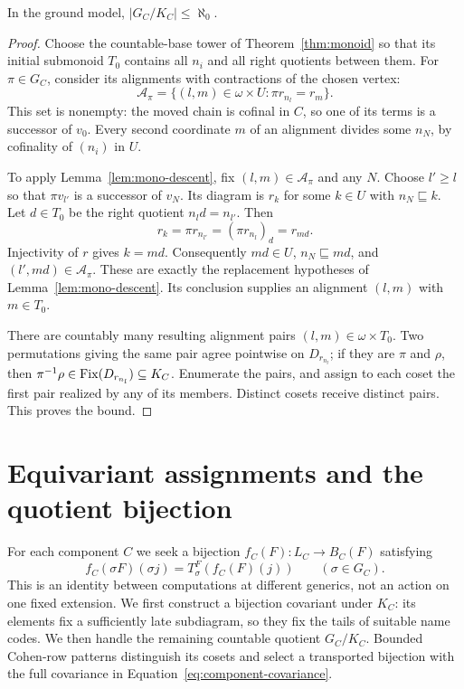 \begin{lemma}\label{lem:countable-germs}
In the ground model, $|G_C/K_C|\le\aleph_0$.
\end{lemma}
\begin{proof}
Choose the countable-base tower of Theorem~\ref{thm:monoid} so that
its initial submonoid $T_0$ contains all $n_i$ and all right
quotients between them. For $\pi\in G_C$, consider its alignments
with contractions of the chosen vertex:
\[
 \mathcal A_\pi=
 \{(l,m)\in\omega\times U:\pi r_{n_l}=r_m\}.
\]
This set is nonempty: the moved chain is cofinal in $C$, so one of
its terms is a successor of $v_0$. Every second coordinate $m$ of
an alignment divides some $n_N$, by cofinality of $(n_i)$ in $U$.

To apply Lemma~\ref{lem:mono-descent}, fix $(l,m)\in\mathcal A_\pi$
and any $N$. Choose $l'\ge l$ so that $\pi v_{l'}$ is a successor
of $v_N$. Its diagram is $r_k$ for some $k\in U$ with
$n_N\sqsubseteq k$. Let $d\in T_0$ be the right quotient
$n_ld=n_{l'}$. Then
\[
 r_k=\pi r_{n_{l'}}=(\pi r_{n_l})_d=r_{md}.
\]
Injectivity of $r$ gives $k=md$. Consequently $md\in U$,
$n_N\sqsubseteq md$, and $(l',md)\in\mathcal A_\pi$.
These are exactly the replacement hypotheses of
Lemma~\ref{lem:mono-descent}. Its conclusion supplies an alignment
$(l,m)$ with $m\in T_0$.

There are countably many resulting alignment pairs
$(l,m)\in\omega\times T_0$. Two permutations giving the same pair
agree pointwise on $D_{r_{n_l}}$; if they are $\pi$ and $\rho$,
then $\pi^{-1}\rho\in\operatorname{Fix}(D_{r_{n_l}})\subseteq K_C$.
Enumerate the pairs, and assign to each coset the first
pair realized by any of its members. Distinct cosets receive distinct
pairs. This proves the bound.
\end{proof}

\section{Equivariant assignments and the quotient bijection}
\label{sec:quotient-equivariance}

For each component $C$ we seek a bijection
$f_C(F):L_C\to B_C(F)$ satisfying
\begin{equation}\label{eq:component-covariance}
 f_C(\sigma F)(\sigma j)=T_\sigma^F(f_C(F)(j))
              \qquad(\sigma\in G_C).
\end{equation}
This is an identity between computations at different generics, not
an action on one fixed extension. We first construct a bijection
covariant under $K_C$: its elements fix a sufficiently late subdiagram,
so they fix the tails of suitable name codes. We then handle the
remaining countable quotient $G_C/K_C$. Bounded Cohen-row patterns
distinguish its cosets and select a transported bijection with the
full covariance in Equation~\eqref{eq:component-covariance}.

